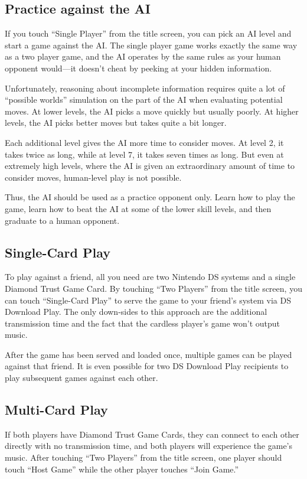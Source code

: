 \documentclass[8pt]{extbook}
\begin{document}
\subsection{Practice against the AI}

If you touch ``Single Player'' from the title screen, you can pick an AI level and start a game against the AI.  The single player game works exactly the same way as a two player game, and the AI operates by the same rules as your human opponent would---it doesn't cheat by peeking at your hidden information.

Unfortunately, reasoning about incomplete information requires quite a lot of ``possible worlds'' simulation on the part of the AI when evaluating potential moves.  At lower levels, the AI picks a move quickly but usually poorly.  At higher levels, the AI picks better moves but takes quite a bit longer.

Each additional level gives the AI more time to consider moves.  At level 2, it takes twice as long, while at level 7, it takes seven times as long.  But even at extremely high levels, where the AI is given an extraordinary amount of time to consider moves, human-level play is not possible.

Thus, the AI should be used as a practice opponent only.  Learn how to play the game, learn how to beat the AI at some of the lower skill levels, and then graduate to a human opponent.

\subsection{Single-Card Play}
\label{sec:singleCard}
To play against a friend, all you need are two Nintendo DS systems and a single Diamond Trust Game Card.  By touching ``Two Players'' from the title screen, you can touch ``Single-Card Play'' to serve the game to your friend's system via DS Download Play.  The only down-sides to this approach are the additional transmission time and the fact that the cardless player's game won't output music.

After the game has been served and loaded once, multiple games can be played against that friend.  It is even possible for two DS Download Play recipients to play subsequent games against each other.

\subsection{Multi-Card Play}
If both players have Diamond Trust Game Cards, they can connect to each other directly with no transmission time, and both players will experience the game's music.  After touching ``Two Players'' from the title screen, one player should touch ``Host Game'' while the other player touches ``Join Game.''
\end{document}
